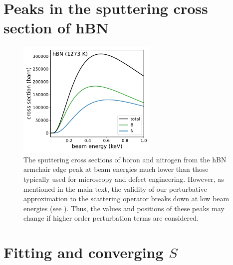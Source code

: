 \documentclass{article}
\begin{document}
\pagebreak
\section{Peaks in the sputtering cross section of hBN}
\label{app:edgePeaks}

\begin{figure}[H]
  \centering
  \includegraphics[width=0.6\textwidth]{figS2.pdf}
  \caption{
    The sputtering cross sections of boron and nitrogen from the hBN armchair
    edge peak at beam energies much lower than those typically used for
    microscopy and defect engineering.
    However, as mentioned in the main text, the validity of our perturbative
    approximation to the scattering operator breaks down at low beam energies
    (see \textit{}).
    Thus, the values and positions of these peaks may change if higher order
    perturbation terms are considered.
  }
  \label{fig:edgePeaks}
\end{figure}

\pagebreak
\section{Fitting and converging $S$}
\label{app:fitting}
\end{document}
